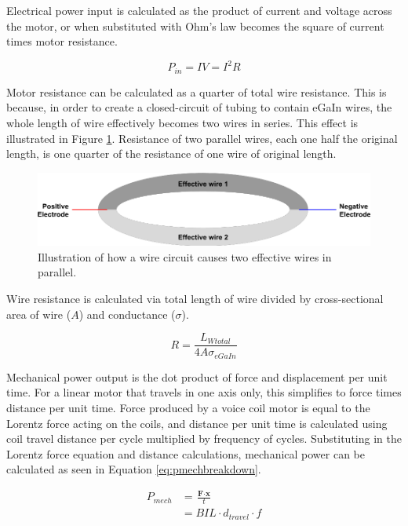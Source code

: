 \documentclass[a4paper,12pt]{article}
\begin{document}
Electrical power input is calculated as the product of current and voltage across the motor, or when substituted with Ohm's law becomes the square of current times motor resistance.

\begin{equation}\label{eq:pin}
    P_{in} = IV = I^2R
\end{equation}

Motor resistance can be calculated as a quarter of total wire resistance. This is because, in order to create a closed-circuit of tubing to contain eGaIn wires, the whole length of wire effectively becomes two wires in series. This effect is illustrated in Figure \ref{fg:parallelwire}. Resistance of two parallel wires, each one half the original length, is one quarter of the resistance of one wire of original length.

\begin{figure}[h!]
    \centering
    \includegraphics[scale=0.4]{parallelwire.png}
    \caption{Illustration of how a wire circuit causes two effective wires in parallel.}
    \label{fg:parallelwire}
\end{figure}

Wire resistance is calculated via total length of wire divided by cross-sectional area of wire ($A$) and conductance ($\sigma$).

\begin{equation}\label{eq:resistance}
    R=\frac{L_{Wtotal}}{4A\sigma_{eGaIn}}
\end{equation}

Mechanical power output is the dot product of force and displacement per unit time. For a linear motor that travels in one axis only, this simplifies to force times distance per unit time. Force produced by a voice coil motor is equal to the Lorentz force acting on the coils, and distance per unit time is calculated using coil travel distance per cycle multiplied by frequency of cycles. Substituting in the Lorentz force equation and distance calculations, mechanical power can be calculated as seen in Equation \ref{eq:pmechbreakdown}.

\begin{equation}\label{eq:pmechbreakdown}
    \begin{split}
   		P_{mech} & = \frac{\textbf{F} \cdot \textbf{x}}{t} \\
    	& = BIL\cdot d_{travel} \cdot f
    \end{split}
\end{equation}
\end{document}
